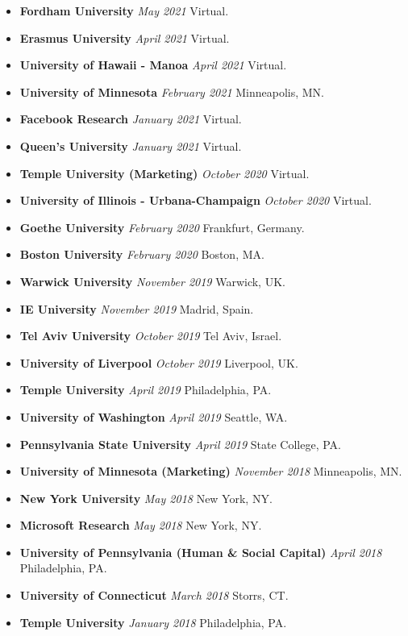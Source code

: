 \documentclass[10.5pt,letterpaper,sans]{moderncv}        %
\begin{document}
\begin{itemize}
\item \textbf{Fordham University} \textit{May 2021} Virtual.
\item \textbf{Erasmus University} \textit{April 2021} Virtual.
\item \textbf{University of Hawaii - Manoa} \textit{April 2021} Virtual.
\item \textbf{University of Minnesota} \textit{February 2021} Minneapolis, MN.
\item \textbf{Facebook Research} \textit{January 2021} Virtual.
\item \textbf{Queen's University} \textit{January 2021} Virtual.
\item \textbf{Temple University (Marketing)} \textit{October 2020} Virtual.
\item \textbf{University of Illinois - Urbana-Champaign} \textit{October 2020} Virtual.
\item \textbf{Goethe University} \textit{February 2020} Frankfurt, Germany.
\item \textbf{Boston University} \textit{February 2020} Boston, MA.
\item \textbf{Warwick University} \textit{November 2019} Warwick, UK.
\item \textbf{IE University} \textit{November 2019} Madrid, Spain.
\item \textbf{Tel Aviv University} \textit{October 2019} Tel Aviv, Israel.
\item \textbf{University of Liverpool} \textit{October 2019} Liverpool, UK.
\item \textbf{Temple University} \textit{April 2019} Philadelphia, PA.
\item \textbf{University of Washington} \textit{April 2019} Seattle, WA.
\item \textbf{Pennsylvania State University} \textit{April 2019} State College, PA.
\item \textbf{University of Minnesota (Marketing)} \textit{November 2018} Minneapolis, MN.
\item \textbf{New York University} \textit{May 2018} New York, NY.
\item \textbf{Microsoft Research} \textit{May 2018} New York, NY.
\item \textbf{University of Pennsylvania (Human \& Social Capital)} \textit{April 2018} Philadelphia, PA.
\item \textbf{University of Connecticut} \textit{March 2018} Storrs, CT.
\item \textbf{Temple University} \textit{January 2018} Philadelphia, PA.

\end{itemize}
\end{document}

